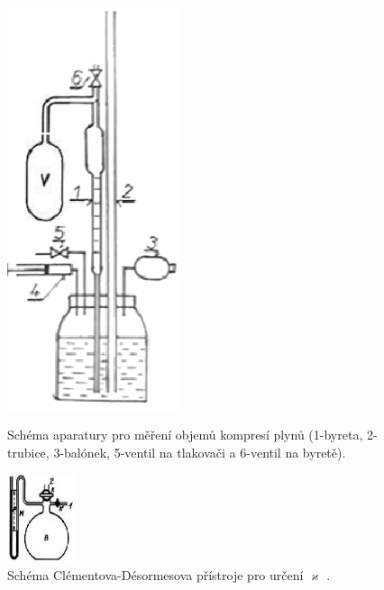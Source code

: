 \documentclass[english]{article}
\begin{document}
	\begin{figure}[h!]
	\centering
	\begin{minipage}{.40\textwidth}
	  \centering
					\includegraphics[width=5cm]{att/aparatura1.png}
					\vspace*{-0.5cm}
					\caption{Schéma aparatury pro měření objemů kompresí plynů (1-byreta, 2-trubice, 3-balónek, 5-ventil na tlakovači a 6-ventil na byretě). \cite{bib:repo}}
					\label{fig:aparatura1}
	\end{minipage}%
	\hfill
	\begin{minipage}{.55\textwidth}
			\begin{minipage}{.90\textwidth}
			  \centering
							\includegraphics[width=2cm]{att/aparatura2.png}
							
							\caption{Schéma Clémentova-Désormesova přístroje pro určení $\varkappa$ .\cite{bib:zadani2}}
							\label{fig:aparatura2}
							\vspace*{1cm}
			

\end{minipage}
\end{minipage}
\end{figure}
\end{document}
